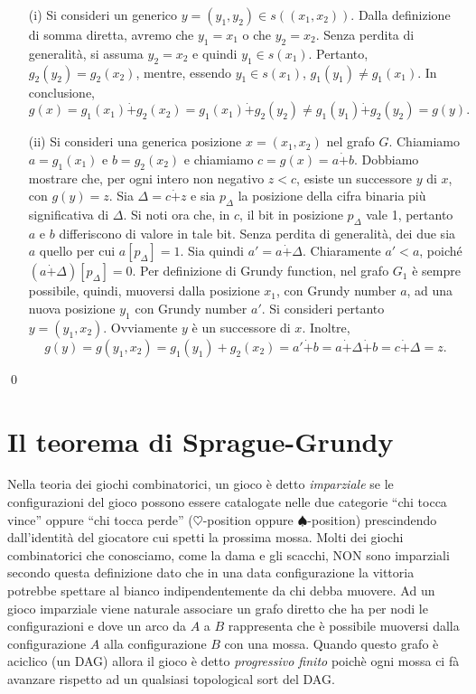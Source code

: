 \documentclass[a4paper, 10pt]{report}
\theoremstyle{definition} %
\begin{document}
\begin{itemize}
\item[(i)] 
  Si consideri un generico $y=(y_1, y_2) \in s((x_1, x_2))$. Dalla definizione
  di somma diretta, avremo che $y_1 = x_1$ o che $y_2 = x_2$. Senza perdita di
  generalit\`a, si assuma $y_2 = x_2$ e quindi $y_1 \in s(x_1)$. Pertanto,
  $g_2(y_2) = g_2(x_2)$, mentre, essendo $y_1 \in s(x_1)$, $g_1(y_1) \neq
  g_1(x_1)$. In conclusione,
\[ g(x) = g_1(x_1) \dot{+} g_2(x_2) = g_1(x_1) \dot{+} g_2(y_2) \neq g_1(y_1)
  \dot{+} g_2(y_2) = g(y). \]
  

\item[(ii)]
  Si consideri una generica posizione $x = (x_1,x_2)$ nel grafo $G$. Chiamiamo
  $a = g_1(x_1)$ e $b = g_2(x_2)$ e chiamiamo $c = g(x) = a \dot{+}
  b$. Dobbiamo mostrare che, per ogni intero non negativo $z<c$, esiste un
  successore $y$ di $x$, con $g(y) = z$. Sia
  $\Delta = c \dot{+} z$ e sia $p_{\Delta}$ la posizione della cifra binaria
  pi\`u significativa di $\Delta$. Si noti ora che, in $c$, il bit in
  posizione $p_{\Delta}$ vale 1, pertanto $a$ e $b$ differiscono di valore in
  tale bit. Senza perdita di generalit\`a, dei due sia $a$ quello per cui $a[p_{\Delta}] = 1$. Sia quindi $a' = a \dot{+} \Delta$. Chiaramente $a' <
  a$, poich\'e $(a \dot{+} \Delta)[p_{\Delta}] = 0$. Per definizione di 
  Grundy function, nel grafo $G_1$ \`e sempre possibile, quindi, muoversi
  dalla posizione $x_1$, con Grundy number $a$, ad una nuova posizione $y_1$ con
  Grundy number $a'$. Si consideri pertanto $y = (y_1, x_2)$. Ovviamente $y$
  \`e un successore di $x$. Inoltre,
  \[ g(y) = g(y_1, x_2) = g_1(y_1) + g_2(x_2) = a' \dot{+} b = a \dot{+}
  \Delta \dot{+} b = c \dot{+} \Delta = z. \]

\end{itemize}
\qed

\newpage

\appendix
\section{Il teorema di Sprague-Grundy}

Nella teoria dei giochi combinatorici,
un gioco è detto \emph{imparziale} se le configurazioni del gioco possono essere
catalogate nelle due categorie ``chi tocca vince'' oppure ``chi tocca perde'' ($\heartsuit$-position oppure $\spadesuit$-position)
prescindendo dall'identità del giocatore cui spetti la prossima mossa.
Molti dei giochi combinatorici che conosciamo,
come la dama e gli scacchi, NON sono imparziali secondo questa definizione
dato che in una data configurazione la vittoria potrebbe spettare al bianco
indipendentemente da chi debba muovere.
Ad un gioco imparziale viene naturale associare un grafo diretto che ha per nodi
le configurazioni e dove un arco da $A$ a $B$ rappresenta che è possibile muoversi
dalla configurazione $A$ alla configurazione $B$ con una mossa.
Quando questo grafo è aciclico (un DAG) allora il gioco
è detto \emph{progressivo finito} poichè ogni mossa ci fà avanzare rispetto ad un qualsiasi
topological sort del DAG.
\end{document}
